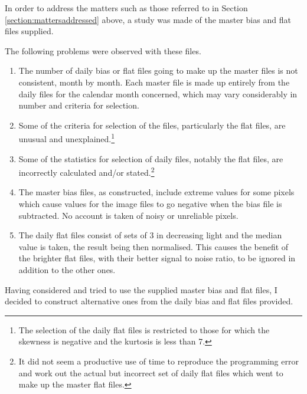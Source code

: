 In order to address the matters such as those referred to in Section
\ref{section:mattersaddressed} above, a study was made of the master bias and
flat files supplied.

The following problems were observed with these files.

\begin{enumerate}
  \item The number of daily bias or flat files going to make up the master files
  is not consistent, month by month. Each master file is made up entirely from
  the daily files for the calendar month concerned, which may vary considerably
  in number and criteria for selection.
  \item Some of the criteria for selection of the files, particularly the flat
  files, are unusual and unexplained.\footnote{The selection of the daily flat
  files is restricted to those for which the skewness is negative and the
  kurtosis is less than 7.}
  \item Some of the statistics for selection of daily files, notably the flat
  files, are incorrectly calculated and/or stated.\footnote{It did not seem a
  productive use of time to reproduce the programming error and work out the actual but incorrect
  set of daily flat files which went to make up the master flat files.}
  \item The master bias files, as constructed, include extreme values for
  some pixels which cause values for the image files to go negative when the
  bias file is subtracted. No account is taken of noisy or unreliable pixels.
  \item The daily flat files consist of sets of 3 in decreasing light and the
  median value is taken, the result being then normalised. This causes the
  benefit of the brighter flat files, with their better signal to noise ratio,
  to be ignored in addition to the other ones.
\end{enumerate}

\clearpage

Having considered and tried to use the supplied master bias and flat files, I
decided to construct alternative ones from the daily bias and flat files
provided.

